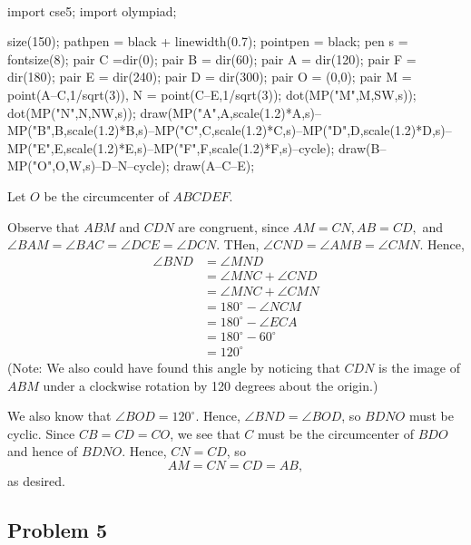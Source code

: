 \begin{mdsoln}
    \ 
    \begin{center}
        \begin{asy}
            import cse5;
            import olympiad;

            size(150);
            pathpen = black + linewidth(0.7); 
            pointpen = black; 
            pen s = fontsize(8);
            pair C =dir(0); pair B = dir(60); pair A = dir(120); pair F = dir(180); pair E = dir(240); pair D = dir(300); pair O = (0,0);
            pair M = point(A--C,1/sqrt(3)), N = point(C--E,1/sqrt(3));
            dot(MP("M",M,SW,s));
            dot(MP("N",N,NW,s));
            draw(MP("A",A,scale(1.2)*A,s)--MP("B",B,scale(1.2)*B,s)--MP("C",C,scale(1.2)*C,s)--MP("D",D,scale(1.2)*D,s)--MP("E",E,scale(1.2)*E,s)--MP("F",F,scale(1.2)*F,s)--cycle);
            draw(B--MP("O",O,W,s)--D--N--cycle);
            draw(A--C--E);
        
    \end{asy}   
    \end{center}
    Let $O$ be the circumcenter of $ABCDEF$.

    Observe that $ABM$ and $CDN$ are congruent, since $AM = CN, AB = CD,$ and $\angle BAM = \angle BAC = \angle DCE = \angle DCN$. THen, $\angle CND = \angle AMB = \angle CMN$. Hence,
    \begin{align*}
    \angle BND &=\angle MND \\ 
    &=\angle MNC + \angle CND \\ 
    &=\angle MNC + \angle CMN \\ 
    &= 180^{\circ} - \angle NCM \\ 
    &= 180^{\circ} - \angle ECA \\ 
    &= 180^{\circ} - 60^{\circ} \\ 
    & = 120^{\circ} 
    \end{align*}(Note: We also could have found this angle by noticing that $CDN$ is the image of $ABM$ under a clockwise rotation by 120 degrees about the origin.)

    We also know that $\angle BOD = 120^{\circ}$. Hence, $\angle BND = \angle BOD$, so $BDNO$ must be cyclic. Since $CB = CD = CO$, we see that $C$ must be the circumcenter of $BDO$ and hence of $BDNO$. Hence, $CN = CD$, so\[ AM = CN = CD = AB, \]as desired.
\end{mdsoln}

\subsection{Problem 5}


